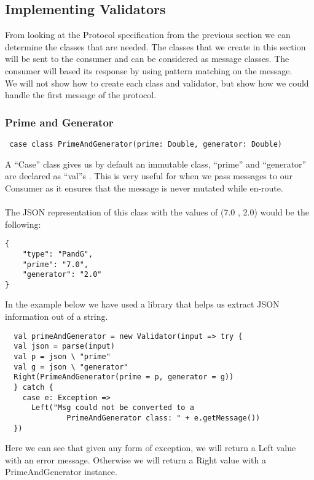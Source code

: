 \subsection{Implementing Validators}
From looking at the Protocol specification from the previous section we can determine the classes that are needed. The classes that we create in this section will be sent to the consumer and can be considered as message classes. The consumer will based its response by using pattern matching on the message.
\\
We will not show how to create each class and validator, but show how we could handle the first message of the protocol.
\subsubsection{Prime and Generator}
\begin{lstlisting}
 case class PrimeAndGenerator(prime: Double, generator: Double)
\end{lstlisting}
A ``Case'' class gives us by default an immutable class, ``prime'' and ``generator'' are declared as ``val''s . This is very useful for when we pass messages to our Consumer as it ensures that the message is never mutated while en-route.
\\\\
The JSON representation of this class with the values of (7.0 , 2.0) would be the following:
\begin{lstlisting}
{
    "type": "PandG",
    "prime": "7.0",
    "generator": "2.0"
}
\end{lstlisting}
In the example below we have used a library that helps us extract JSON information out of a string. 

\begin{lstlisting}
  val primeAndGenerator = new Validator(input => try {
  val json = parse(input)
  val p = json \ "prime"  
  val g = json \ "generator"
  Right(PrimeAndGenerator(prime = p, generator = g))
  } catch {
    case e: Exception =>
      Left("Msg could not be converted to a 
              PrimeAndGenerator class: " + e.getMessage())
  })
\end{lstlisting}
Here we can see that given any form of exception, we will return a Left value with an error message. Otherwise we will return a Right value with a PrimeAndGenerator instance.

